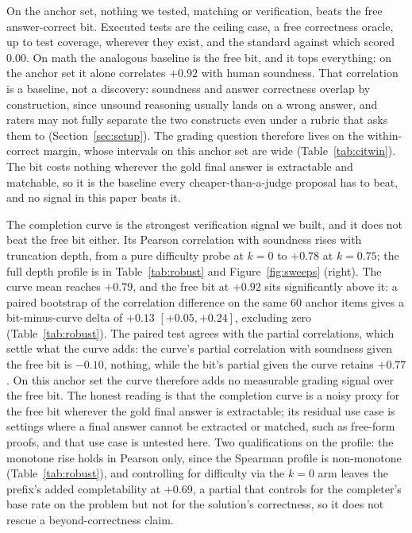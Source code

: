 On the anchor set, nothing we tested, matching or verification, beats the free answer-correct bit.
Executed tests are the ceiling case, a free correctness oracle, up to test coverage, wherever they exist, and the standard against which \tfa{} scored $0.00$.
On math the analogous baseline is the free bit, and it tops everything: on the anchor set it alone correlates $+0.92$ with human soundness.
That correlation is a baseline, not a discovery: soundness and answer correctness overlap by construction, since unsound reasoning usually lands on a wrong answer, and raters may not fully separate the two constructs even under a rubric that asks them to (Section~\ref{sec:setup}).
The grading question therefore lives on the within-correct margin, whose intervals on this anchor set are wide (Table~\ref{tab:citwin}).
The bit costs nothing wherever the gold final answer is extractable and matchable, so it is the baseline every cheaper-than-a-judge proposal has to beat, and no signal in this paper beats it.

The completion curve is the strongest verification signal we built, and it does not beat the free bit either.
Its Pearson correlation with soundness rises with truncation depth, from a pure difficulty probe at $k{=}0$ to $+0.78$ at $k{=}0.75$; the full depth profile is in Table~\ref{tab:robust} and Figure~\ref{fig:sweeps} (right).
The curve mean reaches $+0.79$, and the free bit at $+0.92$ sits significantly above it: a paired bootstrap of the correlation difference on the same 60 anchor items gives a bit-minus-curve delta of $+0.13$ $[+0.05, +0.24]$, excluding zero (Table~\ref{tab:robust}).
The paired test agrees with the partial correlations, which settle what the curve adds: the curve's partial correlation with soundness given the free bit is $-0.10$, nothing, while the bit's partial given the curve retains $+0.77$.
On this anchor set the curve therefore adds no measurable grading signal over the free bit.
The honest reading is that the completion curve is a noisy proxy for the free bit wherever the gold final answer is extractable; its residual use case is settings where a final answer cannot be extracted or matched, such as free-form proofs, and that use case is untested here.
Two qualifications on the profile: the monotone rise holds in Pearson only, since the Spearman profile is non-monotone (Table~\ref{tab:robust}), and controlling for difficulty via the $k{=}0$ arm leaves the prefix's added completability at $+0.69$, a partial that controls for the completer's base rate on the problem but not for the solution's correctness, so it does not rescue a beyond-correctness claim.

